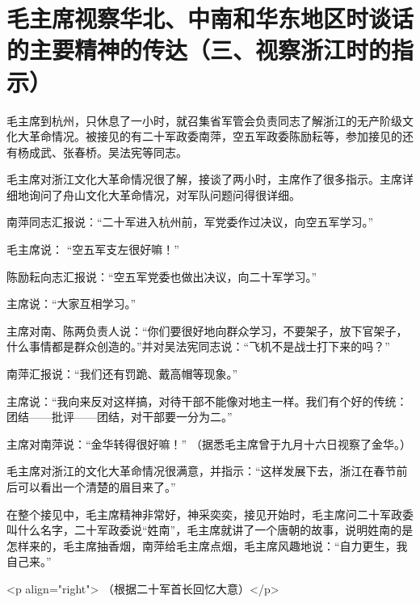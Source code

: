 \section[毛主席视察华北、中南和华东地区时谈话的主要精神的传达（三、视察浙江时的指示）]{毛主席视察华北、中南和华东地区时谈话的主要精神的传达（三、视察浙江时的指示）}



毛主席到杭州，只休息了一小时，就召集省军管会负责同志了解浙江的无产阶级文化大革命情况。被接见的有二十军政委南萍，空五军政委陈励耘等，参加接见的还有杨成武、张春桥。吴法宪等同志。

毛主席对浙江文化大革命情况很了解，接谈了两小时，主席作了很多指示。主席详细地询问了舟山文化大革命情况，对军队问题问得很详细。

南萍同志汇报说：“二十军进入杭州前，军党委作过决议，向空五军学习。”

毛主席说： “空五军支左很好嘛！”

陈励耘向志汇报说：“空五军党委也做出决议，向二十军学习。”

主席说：“大家互相学习。”

主席对南、陈两负责人说：“你们要很好地向群众学习，不要架子，放下官架子，什么事情都是群众创造的。”并对吴法宪同志说：“飞机不是战士打下来的吗？”

南萍汇报说：“我们还有罚跪、戴高帽等现象。”

主席说：“我向来反对这样搞，对待干部不能像对地主一样。我们有个好的传统：团结——批评——团结，对干部要一分为二。”

主席对南萍说：“金华转得很好嘛！”  （据悉毛主席曾于九月十六日视察了金华。）

毛主席对浙江的文化大革命情况很满意，并指示：“这样发展下去，浙江在春节前后可以看出一个清楚的眉目来了。”

在整个接见中，毛主席精神非常好，神采奕奕，接见开始时，毛主席问二十军政委叫什么名字，二十军政委说“姓南”，毛主席就讲了一个唐朝的故事，说明姓南的是怎样来的，毛主席抽香烟，南萍给毛主席点烟，毛主席风趣地说：“自力更生，我自己来。”

<p align="right"> （根据二十军首长回忆大意）</p>


